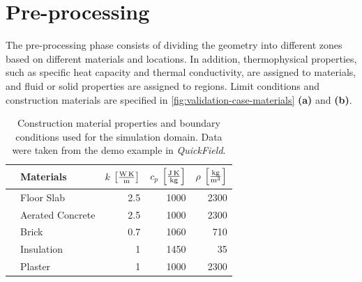 \section{Pre-processing}
The pre-processing phase consists of dividing the geometry into different zones based on different materials and locations. In addition, thermophysical properties, such as specific heat capacity and thermal conductivity, are assigned to materials, and fluid or solid properties are assigned to regions. Limit conditions and construction materials are specified in \cref{fig:validation-case-materials} \textbf{(a)} and \textbf{(b)}. 





\begin{table}[htb]
    \centering
    \label{tab:construction_material_properties}
    \caption[3D Material Properties]{Construction material properties and boundary conditions used for the simulation domain. Data were taken from the demo example in \textit{QuickField}.}
      \centering
        \begin{tabular}{clrrr}    
            \toprule   
            & Materials       & $k$ $\left[ \si[per-mode=fraction]{\watt\per\metre\kelvin} \right]$ & $c_p$   $\left[ \si[per-mode=fraction]{\joule\per\kilogram\kelvin}\right]$ & $\rho$  $\left[ \si[per-mode=fraction]{\kilogram\per\cubic\metre} \right]$   \\
            \midrule
            & Floor Slab        & 2.5                        & 1000                      & 2300               \\
            & Aerated Concrete  & 2.5                        & 1000                      & 2300               \\
            & Brick             & 0.7                        & 1060                       & 710               \\
            & Insulation        & 1                         & 1450                      & 35               \\
            & Plaster           & 1                         & 1000                      & 2300              \\
            \bottomrule
        \end{tabular}
  
\end{table}


